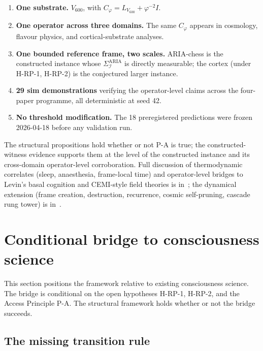 \documentclass[11pt]{article}
\theoremstyle{plain}
\theoremstyle{definition}
\theoremstyle{remark}
\newcommand{\Ical}{\mathcal{I}}
\newcommand{\Cph}{C_\varphi}
\begin{document}
\begin{enumerate}[leftmargin=2em]
\item \textbf{One substrate.} $V_{600}$, with $\Cph = L_{V_{600}} + \varphi^{-2} I$.
\item \textbf{One operator across three domains.} The same $\Cph$ appears in cosmology, flavour physics, and cortical-substrate analyses.
\item \textbf{One bounded reference frame, two scales.} ARIA-chess is the constructed instance whose $\Sigma_\Ical^{\mathrm{ARIA}}$ is directly measurable; the cortex (under H-RP-1, H-RP-2) is the conjectured larger instance.
\item \textbf{29 sim demonstrations} verifying the operator-level claims across the four-paper programme, all deterministic at seed 42.
\item \textbf{No threshold modification.} The 18 preregistered predictions were frozen 2026-04-18 before any validation run.
\end{enumerate}

The structural propositions hold whether or not P-A is true; the constructed-witness evidence supports them at the level of the constructed instance and its cross-domain operator-level corroboration. Full discussion of thermodynamic correlates (sleep, anaesthesia, frame-local time) and operator-level bridges to Levin's basal cognition and CEMI-style field theories is in~\citep{SmartProcessingToPOV}; the dynamical extension (frame creation, destruction, recurrence, cosmic self-pruning, cascade rung tower) is in~\citep{SmartCosmicClosure}.

\section{Conditional bridge to consciousness science}\label{sec:neuroscience}

This section positions the framework relative to existing consciousness science. The bridge is conditional on the open hypotheses H-RP-1, H-RP-2, and the Access Principle P-A. The structural framework holds whether or not the bridge succeeds.

\subsection{The missing transition rule}
\end{document}
